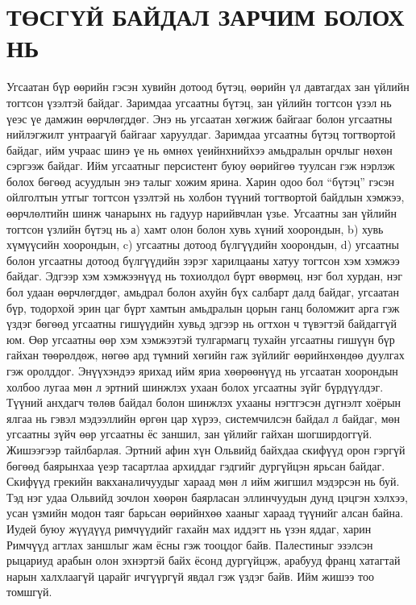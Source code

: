 \section{ТӨСГҮЙ БАЙДАЛ ЗАРЧИМ БОЛОХ НЬ}
Угсаатан бүр өөрийн гэсэн хувийн дотоод бүтэц, өөрийн үл давтагдах зан үйлийн тогтсон үзэлтэй байдаг. Заримдаа угсаатны бүтэц, зан үйлийн тогтсон үзэл нь үеэс үе дамжин өөрчлөгддөг. Энэ нь угсаатан хөгжиж байгааг болон угсаатны нийлэгжилт унтраагүй байгааг харуулдаг. Заримдаа угсаатны бүтэц тогтвортой байдаг, ийм учраас шинэ үе нь өмнөх үеийнхнийхээ амьдралын орчлыг нөхөн сэргээж байдаг. Ийм угсаатныг персистент буюу өөрийгөө туулсан гэж нэрлэж болох бөгөөд асуудлын энэ талыг хожим ярина. Харин одоо бол “бүтэц” гэсэн ойлголтын утгыг тогтсон үзэлтэй нь холбон түүний тогтвортой байдлын хэмжээ, өөрчлөлтийн шинж чанарынх нь гадуур нарийвчлан үзье.
Угсаатны зан үйлийн тогтсон үзлийн бүтэц нь а) хамт олон болон хувь хүний хоорондын, b) хувь хүмүүсийн хоорондын, c) угсаатны дотоод бүлгүүдийн хоорондын, d) угсаатны болон угсаатны дотоод бүлгүүдийн зэрэг харилцааны хатуу тогтсон хэм хэмжээ байдаг. Эдгээр хэм хэмжээнүүд нь тохиолдол бүрт өвөрмөц, нэг бол хурдан, нэг бол удаан өөрчлөгддөг, амьдрал болон ахуйн бүх салбарт далд байдаг, угсаатан бүр, тодорхой эрин цаг бүрт хамтын амьдралын цорын ганц боломжит арга гэж үздэг бөгөөд угсаатны гишүүдийн хувьд эдгээр нь огтхон ч түвэгтэй байдаггүй юм. Өөр угсаатны өөр хэм хэмжээтэй тулгармагц тухайн угсаатны гишүүн бүр гайхан төөрөлдөж, нөгөө ард түмний хөгийн гаж зүйлийг өөрийнхөндөө дуулгах гэж оролддог. Энүүхэндээ ярихад ийм яриа хөөрөөнүүд нь угсаатан хоорондын холбоо лугаа мөн л эртний шинжлэх ухаан болох угсаатны зүйг бүрдүүлдэг. Түүний анхдагч төлөв байдал болон шинжлэх ухааны нэгтгэсэн дүгнэлт хоёрын ялгаа нь гэвэл мэдээллийн өргөн цар хүрээ, системчилсэн байдал л байдаг, мөн угсаатны зүйч өөр угсаатны ёс заншил, зан үйлийг гайхан шогширдоггүй.
Жишээгээр тайлбарлая. Эртний афин хүн Ольвийд байхдаа скифүүд орон гэргүй бөгөөд баярынхаа үеэр тасартлаа архиддаг гэдгийг дургүйцэн ярьсан байдаг. Скифүүд грекийн вакханаличуудыг хараад мөн л ийм жигшил мэдэрсэн нь буй. Тэд нэг удаа Ольвийд зочлон хөөрөн баярласан эллинчуудын дунд цэцгэн хэлхээ, усан үзмийн модон таяг барьсан өөрийнхөө хааныг хараад түүнийг алсан байна. Иудей буюу жүүдүүд римчүүдийг гахайн мах иддэгт нь үзэн яддаг, харин Римчүүд агтлах заншлыг жам ёсны гэж тооцдог байв. Палестиныг эзэлсэн рыцариуд арабын олон эхнэртэй байх ёсонд дургүйцэж, арабууд франц хатагтай нарын халхлаагүй царайг ичгүүргүй явдал гэж үздэг байв. Ийм жишээ тоо томшгүй.
